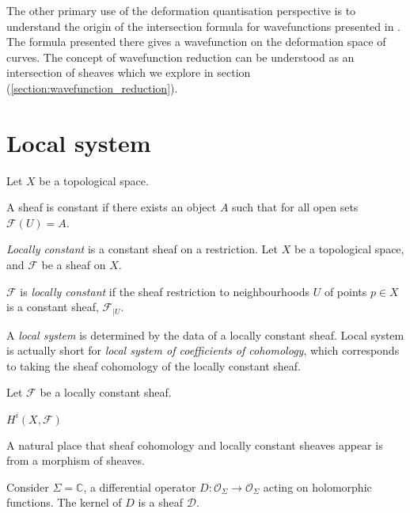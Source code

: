     The other primary use of the deformation quantisation perspective is to understand the origin of the intersection formula for wavefunctions presented in \cite[ section (7.2)]{ks_airy}. The formula presented there gives a wavefunction on the deformation space of curves. The concept of wavefunction reduction can be understood as an intersection of sheaves which we explore in section (\ref{section:wavefunction_reduction}).
    \newpage 
    
    
    \section{Local system}
    
    Let \(X\) be a topological space.
    \begin{defn}
    A sheaf is constant if there exists an object \(A\) such that for all open sets \( \mathcal{F}(U) = A\).
    \end{defn}
    
    \emph{Locally constant} is a constant sheaf on a restriction.
    Let \(X\) be a topological space, and \( \mathcal{F}\) be a sheaf on \(X\).
    
    \begin{defn}
    \( \mathcal{F}\) is \emph{locally constant} if the sheaf restriction to neighbourhoods \(U\) of points \( p \in X\)  is a constant sheaf,
    \( \mathcal{F}_{|U}\).
    \end{defn}

    A \emph{local system} is determined by the data of a locally constant sheaf. Local system is actually short for \emph{local system of coefficients of cohomology}, which corresponds to taking the sheaf cohomology of the locally constant sheaf.
    
    Let \( \mathcal{F}\) be a locally constant sheaf.    
    \begin{defn}
    \( H^i(X,\mathcal{F})\)
    \end{defn}
    
    A natural place that sheaf cohomology and locally constant sheaves appear is from a morphism of sheaves.
    \begin{ex}
    Consider \(\Sigma = \mathbb{C}\), a differential operator \( D: \mathcal{O}_\Sigma \rightarrow \mathcal{O}_\Sigma\) acting on holomorphic functions.  The kernel of \(D\) is a sheaf \( \mathcal{D}\).
    
    \end{ex}
    
